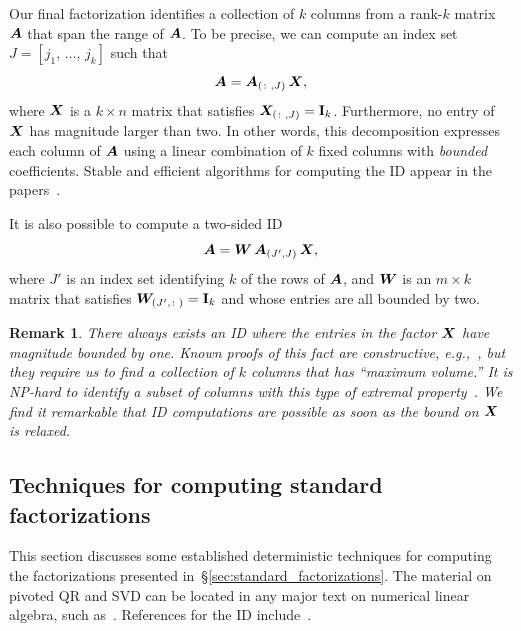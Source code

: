 \documentclass[final]{siamltex}
\newcounter{algorithm}[section]
\newtheorem{remark}{Remark}[section]
\begin{document}
Our final factorization %
identifies a collection of $k$ columns from a rank-$k$ matrix $\bm{A}$ that
span the range of $\bm{A}$.
To be precise, we can compute an index set $J = [j_{1},\,\dots,\,j_{k}]$
such that
$$
\bm{A} = \bm{A}_{(\colon,J)}\,\bm{X},
$$
where $\bm{X}$ is a $k\times n$ matrix that satisfies $\bm{X}_{(\colon,J)} = \mathbf{I}_{k}$.
Furthermore, no entry of $\bm{X}$ has magnitude larger than two.
In other words, this decomposition expresses each column of $\bm{A}$
using a linear combination of $k$ fixed columns with \emph{bounded} coefficients.
Stable and efficient algorithms for computing the ID appear in the papers~\cite{mskel,gu_rrqr}.

It is also possible to compute a two-sided ID
$$
\bm{A} = \bm{W} \,\bm{A}_{(J',J)}\,\bm{X},
$$
where $J'$ is an index set identifying $k$ of the rows of $\bm{A}$,
and $\bm{W}$ is an $m\times k$ matrix that satisfies $\bm{W}_{(J',\colon)} = \mathbf{I}_{k}$
and whose entries are all bounded by two.

\lsp

\begin{remark} \rm
There always exists an ID where the entries in the factor $\bm{X}$
have magnitude bounded by one.  Known proofs of this fact
are constructive, e.g.,~\cite[Lem.~3.3]{Pan00:Existence-Computation},
but they require us to find a collection of $k$ columns that has ``maximum volume.''
It is {\sf NP}-hard to identify a subset of columns
with this type of extremal property~\cite{CM09:Selecting-Maximum}.
We find it remarkable that ID computations are possible as soon as
the bound on $\bm{X}$ is relaxed.
\end{remark}

\lsp

\subsection{Techniques for computing standard factorizations}
\label{sec:standard_techniques}

This section discusses some established deterministic techniques
for computing the factorizations presented
in~\S\ref{sec:standard_factorizations}.  The material
on pivoted QR and SVD can be located in any major text on
numerical linear algebra, such as~\cite{golub,trefethen_bau}.
References for the ID include~\cite{gu_rrqr,mskel}.
\end{document}

